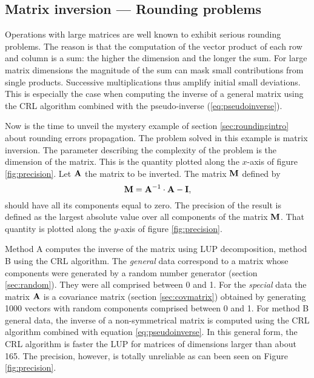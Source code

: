 \documentclass[twoside]{book}
\begin{document}
\subsection{Matrix inversion --- Rounding problems}
\label{sec:matrixrounding} Operations with large matrices are well
known to exhibit serious rounding problems. The reason is that the
computation of the vector product of each row and column is a sum:
the higher the dimension and the longer the sum. For large matrix
dimensions the magnitude of the sum can mask small contributions
from single products. Successive multiplications thus amplify
initial small deviations. This is especially the case when
computing the inverse of a general matrix using the CRL algorithm
combined with the pseudo-inverse (\ref{eq:pseudoinverse}).

Now is the time to unveil the mystery example of section
\ref{sec:roundingintro} about rounding errors propagation. The
problem solved in this example is matrix inversion. The parameter
describing the complexity of the problem is the dimension of the
matrix. This is the quantity plotted along the $x$-axis of figure
\ref{fig:precision}. Let ${\bf A}$ the matrix to be inverted. The
matrix ${\bf M}$ defined by
\begin{equation}
  {\bf M}={\bf A}^{-1}\cdot{\bf A}-{\bf I},
\end{equation}
should have all its components equal to zero. The precision of the
result is defined as the largest absolute value over all
components of the matrix ${\bf M}$. That quantity is plotted along
the $y$-axis of figure \ref{fig:precision}.

Method A computes the inverse of the matrix using LUP
decomposition, method B using the CRL algorithm. The {\sl general}
data correspond to a matrix whose components were generated by a
random number generator (\cf section \ref{sec:random}). They were
all comprised between 0 and 1. For the {\sl special} data the
matrix ${\bf A}$ is a covariance matrix (\cf section
\ref{sec:covmatrix}) obtained by generating 1000 vectors with
random components comprised between 0 and 1. For method B general
data, the inverse of a non-symmetrical matrix is computed using
the CRL algorithm combined with equation \ref{eq:pseudoinverse}.
In this general form, the CRL algorithm is faster the LUP for
matrices of dimensions larger than about 165. The precision,
however, is totally unreliable as can been seen on Figure
\ref{fig:precision}.
\end{document}

